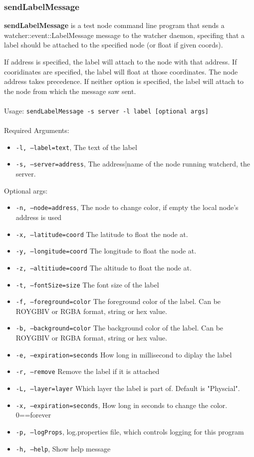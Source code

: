 \newpage
\label{sendLabelMessage}
\subsubsection{sendLabelMessage}
{\bf sendLabelMessage} is a test node command line program that sends a watcher::event::LabelMessage message to the watcher daemon, specifing that a label should be attached to the specified node (or float if given coords).

If address is specified, the label will attach to the node with that address. If cooridinates are
specified, the label will float at those coordinates. The node address takes precedence. If neither
option is specified, the label will attach to the node from which the message saw sent.
\\\\
Usage: 
{\tt sendLabelMessage -s server -l label [optional args]}
\\\\
Required Arguments:
\begin{itemize}
\item {\tt -l, --label=text}, The text of the label
\item {\tt -s, --server=address}, The address|name of the node running watcherd, the server.
\end{itemize}
Optional args:
\begin{itemize}
\item {\tt -n, --node=address}, The node to change color, if empty the local node's address is used
\item {\tt -x, --latitude=coord}        The latitude to float the node at.
\item {\tt -y, --longitude=coord}       The longitude to float the node at.
\item {\tt -z, --altitiude=coord}       The altitude to float the node at.
\item {\tt -t, --fontSize=size}         The font size of the label
\item {\tt -f, --foreground=color}      The foreground color of the label. Can be ROYGBIV or RGBA format, string or hex value.
\item {\tt -b, --background=color}      The background color of the label. Can be ROYGBIV or RGBA format, string or hex value.
\item {\tt -e, --expiration=seconds}    How long in millisecond to diplay the label
\item {\tt -r, --remove}                Remove the label if it is attached
\item {\tt -L, --layer=layer}           Which layer the label is part of. Default is "Physcial".
\item {\tt -x, --expiration=seconds}, How long in seconds to change the color. 0==forever
\item {\tt -p, --logProps}, log.properties file, which controls logging for this program
\item {\tt -h, --help}, Show help message
\end{itemize}

